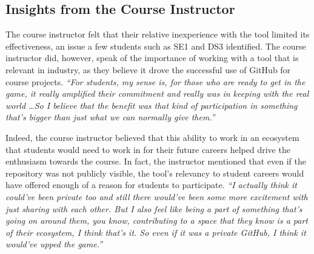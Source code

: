 \subsection{Insights from the Course Instructor}
The course instructor felt that their relative inexperience with the tool limited its effectiveness, an issue a few students such as SE1 and DS3 identified. The course instructor did, however, speak of the importance of working with a tool that is relevant in industry, as they believe it drove the successful use of GitHub for course projects. \textit{``For students, my sense is, for those who are ready to get in the game, it really amplified their commitment and really was in keeping with the real world \ldots So I believe that the benefit was that kind of participation in something that's bigger than just what we can normally give them.''}


Indeed, the course instructor believed that this ability to work in an ecosystem that students would need to work in for their future careers helped drive the enthusiasm towards the course. In fact, the instructor mentioned that even if the repository was not publicly visible, the tool's relevancy to student careers would have offered enough of a reason for students to participate. \textit{``I actually think it could've been private too and still there would've been some more excitement with just sharing with each other. But I also feel like being a part of something that's going on around them, you know, contributing to a space that they know is a part of their ecosystem, I think that's it. So even if it was a private GitHub, I think it would've upped the game.''}


